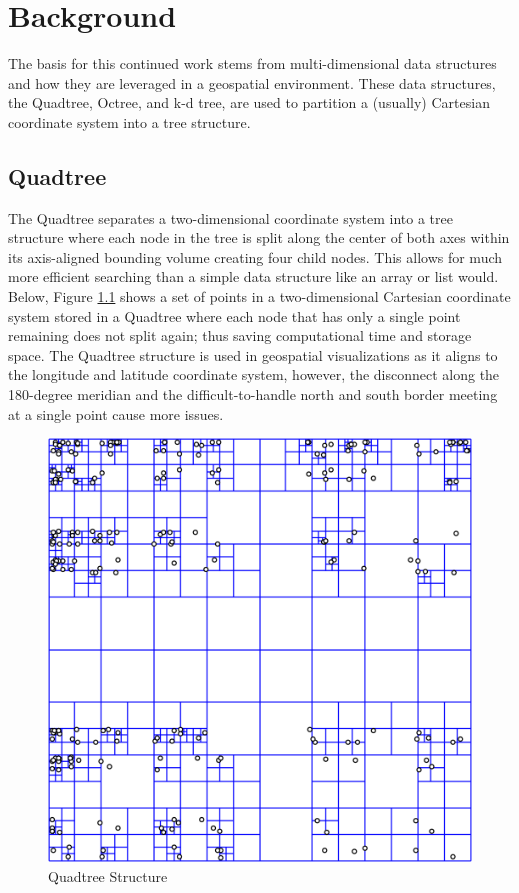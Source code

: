 \chapter{Background}

The basis for this continued work stems from multi-dimensional data structures
and how they are leveraged in a geospatial environment. These data structures,
the Quadtree, Octree, and k-d tree, are used to partition a (usually) Cartesian
coordinate system into a tree structure.

\section{Quadtree}

The Quadtree separates a two-dimensional coordinate system into a tree structure
where each node in the tree is split along the center of both axes within its
axis-aligned bounding volume creating four child nodes. This allows for much
more efficient searching than a simple data structure like an array or list
would. Below, Figure \ref{fig:quadtree} shows a set of points in a
two-dimensional Cartesian coordinate system stored in a Quadtree where each node that has only a
single point remaining does not split again; thus saving computational time and
storage space. The Quadtree structure is used in geospatial visualizations as it
aligns to the longitude and latitude coordinate system, however, the disconnect
along the 180-degree meridian and the difficult-to-handle north and south border
meeting at a single point cause more issues.

\begin{figure}[htb]
\begin{center}
\includegraphics[width=.5\linewidth]{images/Point_quadtree.png}
\end{center}
\caption{Quadtree Structure {\cite{10_eppstein_2005}}}
\label{fig:quadtree}
\end{figure}

